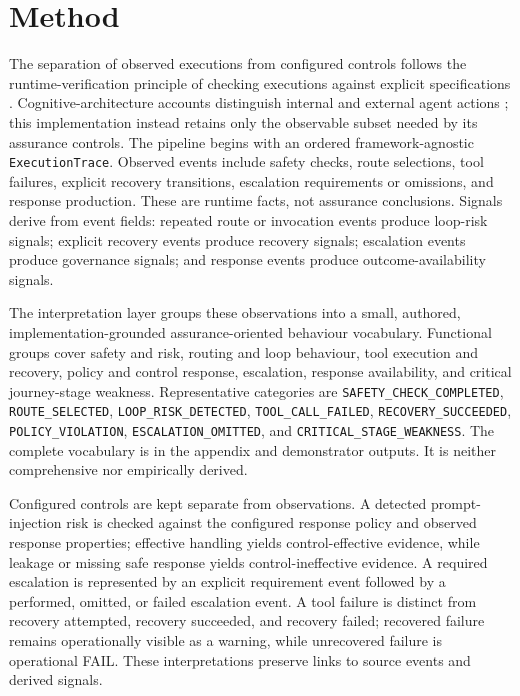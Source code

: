 \documentclass{article}
\begin{document}
\section{Method}
The separation of observed executions from configured controls follows the runtime-verification principle of checking executions against explicit specifications \cite{leucker2009runtime}. Cognitive-architecture accounts distinguish internal and external agent actions \cite{sumers2024coala}; this implementation instead retains only the observable subset needed by its assurance controls.
The pipeline begins with an ordered framework-agnostic \texttt{ExecutionTrace}. Observed events include safety checks, route selections, tool failures, explicit recovery transitions, escalation requirements or omissions, and response production. These are runtime facts, not assurance conclusions. Signals derive from event fields: repeated route or invocation events produce loop-risk signals; explicit recovery events produce recovery signals; escalation events produce governance signals; and response events produce outcome-availability signals.

The interpretation layer groups these observations into a small, authored, implementation-grounded assurance-oriented behaviour vocabulary. Functional groups cover safety and risk, routing and loop behaviour, tool execution and recovery, policy and control response, escalation, response availability, and critical journey-stage weakness. Representative categories are \texttt{SAFETY\_CHECK\_COMPLETED}, \texttt{ROUTE\_SELECTED}, \texttt{LOOP\_RISK\_DETECTED}, \texttt{TOOL\_CALL\_FAILED}, \texttt{RECOVERY\_SUCCEEDED}, \texttt{POLICY\_VIOLATION}, \texttt{ESCALATION\_OMITTED}, and \texttt{CRITICAL\_STAGE\_WEAKNESS}. The complete vocabulary is in the appendix and demonstrator outputs. It is neither comprehensive nor empirically derived.

Configured controls are kept separate from observations. A detected prompt-injection risk is checked against the configured response policy and observed response properties; effective handling yields control-effective evidence, while leakage or missing safe response yields control-ineffective evidence. A required escalation is represented by an explicit requirement event followed by a performed, omitted, or failed escalation event. A tool failure is distinct from recovery attempted, recovery succeeded, and recovery failed; recovered failure remains operationally visible as a warning, while unrecovered failure is operational FAIL. These interpretations preserve links to source events and derived signals.
\end{document}
